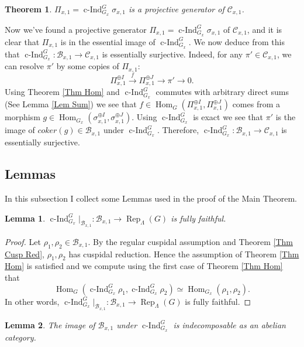 \documentclass{article}
\newtheorem{theorem}{Theorem}
\newtheorem{lemma}{Lemma}
\DeclareMathOperator{\cInd}{\operatorname{c-Ind}}
\newcommand{\Hom}{\operatorname{Hom}}
\newcommand{\Rep}{\operatorname{Rep}}
\begin{document}
	\begin{theorem}\label{Thm Proj}
		$\Pi_{x,1}=\cInd_{G_x}^G\sigma_{x,1}$ is a projective generator of $\mathcal{C}_{x,1}$.
	\end{theorem}
	
	Now we've found a projective generator $\Pi_{x,1}=\cInd_{G_x}^G\sigma_{x,1}$ of $\mathcal{C}_{x,1}$, and it is clear that $\Pi_{x,1}$ is in the essential image of $\cInd_{G_x}^G$. We now deduce from this that $\cInd_{G_x}^G: \mathcal{B}_{x,1} \to \mathcal{C}_{x,1}$ is essentially surjective. Indeed, for any $\pi' \in \mathcal{C}_{x,1}$, we can resolve $\pi'$ by some copies of $\Pi_{x,1}$:
	$$\Pi_{x,1}^{\oplus I} \xrightarrow{f} \Pi_{x,1}^{\oplus J} \to \pi' \to 0.$$
	Using Theorem \ref{Thm Hom} and $\cInd_{G_x}^G$ commutes with arbitrary direct sums (See Lemma \ref{Lem Sum}) we see that $f \in \Hom_G(\Pi_{x,1}^{\oplus I}, \Pi_{x,1}^{\oplus J})$ comes from a morphism $g \in \Hom_{G_x}(\sigma_{x,1}^{\oplus I}, \sigma_{x,1}^{\oplus J})$. Using $\cInd_{G_x}^G$ is exact we see that $\pi'$ is the image of $coker(g) \in \mathcal{B}_{x,1}$ under $\cInd_{G_x}^G$. Therefore, $\cInd_{G_x}^G: \mathcal{B}_{x,1} \to \mathcal{C}_{x,1}$ is essentially surjective.
	
	\subsection{Lemmas}
	
	In this subsection I collect some Lemmas used in the proof of the Main Theorem.
	
	\begin{lemma}\label{Lem Thm Hom implies fully faithful}
		$\cInd_{G_x}^G|_{\mathcal{B}_{x,1}}: \mathcal{B}_{x,1} \to \Rep_{\Lambda}(G)$ is fully faithful.
	\end{lemma}
	
	\begin{proof}
		Let $\rho_1, \rho_2 \in \mathcal{B}_{x,1}$. By the regular cuspidal assumption and Theorem \ref{Thm Cusp Red}, $\rho_1, \rho_2$ has cuspidal reduction. Hence the assumption of Theorem \ref{Thm Hom} is satisfied and we compute using the first case of Theorem \ref{Thm Hom} that
		$$\Hom_G(\cInd_{G_x}^G\rho_1, \cInd_{G_x}^G\rho_2) \simeq \Hom_{G_x}(\rho_1, \rho_2).$$
		In other words, $\cInd_{G_x}^G|_{\mathcal{B}_{x,1}}: \mathcal{B}_{x,1} \to \Rep_{\Lambda}(G)$ is fully faithful.
	\end{proof}
	
	\begin{lemma}\label{Lem Indec}
		The image of $\mathcal{B}_{x,1}$ under $\cInd_{G_x}^G$ is indecomposable as an abelian category.
	\end{lemma}
	
\end{document}

